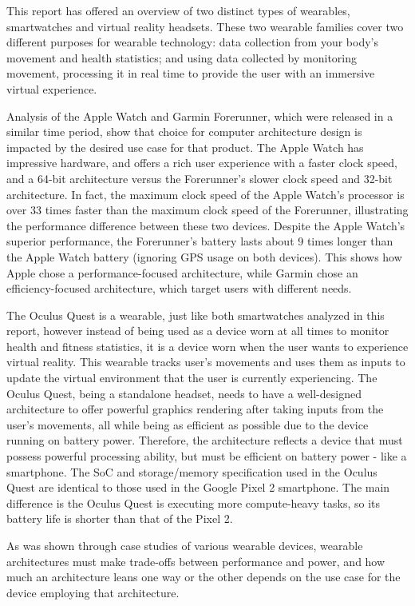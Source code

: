 This report has offered an overview of two distinct types of wearables,
smartwatches and virtual reality headsets. These two wearable families
cover two different purposes for wearable technology: data collection
from your body's movement and health statistics; and using data collected
by monitoring movement, processing it in real time to provide the user
with an immersive virtual experience.

Analysis of the Apple Watch and Garmin Forerunner, which were released
in a similar time period, show that choice for computer architecture
design is impacted by the desired use case for that product. The Apple
Watch has impressive hardware, and offers a rich user experience with
a faster clock speed, and a 64-bit architecture versus the Forerunner's
slower clock speed and 32-bit architecture. In fact, the maximum clock
speed of the Apple Watch's processor is over 33 times faster than the
maximum clock speed of the Forerunner, illustrating the performance difference 
between these two devices. Despite the Apple Watch's superior performance, the 
Forerunner's battery lasts about 9 times longer than the Apple Watch battery
(ignoring GPS usage on both devices). This shows how Apple chose a performance-focused
architecture, while Garmin chose an efficiency-focused architecture, which target
users with different needs.

The Oculus Quest is a wearable, just like both smartwatches analyzed in this report,
however instead of being used as a device worn at all times to monitor health and
fitness statistics, it is a device worn when the user wants to experience virtual reality.
This wearable tracks user's movements and uses them as inputs to update the virtual
environment that the user is currently experiencing. The Oculus Quest, being
a standalone headset, needs to have a well-designed architecture
to offer powerful graphics rendering after taking inputs from the user's movements,
all while being as efficient as possible due to the device running on battery power.
Therefore, the architecture reflects a device that must possess powerful processing
ability, but must be efficient on battery power - like a smartphone. The SoC and storage/memory
specification used in the Oculus Quest are identical to those used in the Google Pixel
2 smartphone. The main difference is the Oculus Quest is executing more compute-heavy tasks,
so its battery life is shorter than that of the Pixel 2.

As was shown through case studies of various wearable devices, wearable architectures
must make trade-offs between performance and power, and how much an architecture
leans one way or the other depends on the use case for the device employing that
architecture.